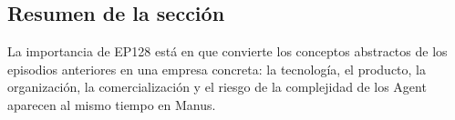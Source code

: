 \subsection{Resumen de la sección}

La importancia de EP128 está en que convierte los conceptos abstractos de los episodios anteriores en una empresa concreta: la tecnología, el producto, la organización, la comercialización y el riesgo de la complejidad de los Agent aparecen al mismo tiempo en Manus.
